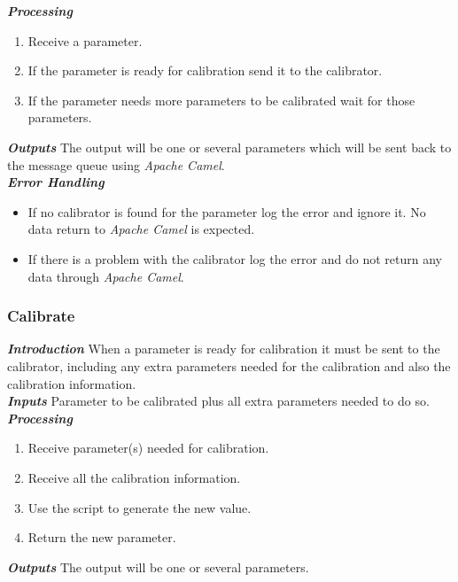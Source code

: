 \textbf{\emph{Processing}}\linebreak
\begin{enumerate}
\item Receive a parameter.
\item If the parameter is ready for calibration send it to the calibrator.
\item If the parameter needs more parameters to be calibrated wait for those parameters.
\end{enumerate}
\pagebreak
\textbf{\emph{Outputs}}\linebreak
The output will be one or several parameters which will be sent back to the message queue using \emph{Apache Camel}.\\


\textbf{\emph{Error Handling}}\\
\begin{itemize}
\item If no calibrator is found for the parameter log the error and ignore it. No data return to \emph{Apache Camel} is expected.
\item If there is a problem with the calibrator log the error and do not return any data through \emph{Apache Camel}.
\end{itemize}

\vspace*{1\baselineskip}
\subsubsection{Calibrate}

\textbf{\emph{Introduction}}\linebreak
When a parameter is ready for calibration it must be sent to the calibrator, including any extra parameters needed for the calibration and also the calibration information.\\

\textbf{\emph{Inputs}}\linebreak
Parameter to be calibrated plus all extra parameters needed to do so.\\

\textbf{\emph{Processing}}\linebreak
\begin{enumerate}
\item Receive parameter(s) needed for calibration.
\item Receive all the calibration information.
\item Use the script to generate the new value.
\item Return the new parameter.
\end{enumerate}
\vspace*{1\baselineskip}
\textbf{\emph{Outputs}}\linebreak
The output will be one or several parameters.\\


